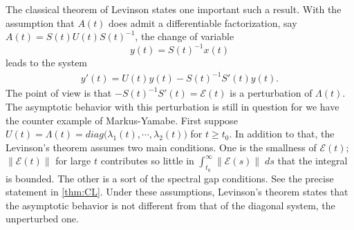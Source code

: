\documentclass[a4paper,11pt]{article}
\newcommand{\E}{\mathcal{E}}
\theoremstyle{remark}
\begin{document}
The classical theorem of Levinson states one important such a result. With the assumption that $A(t)$ does admit a differentiable factorization, say $A(t) = S(t)U(t)S(t)^{-1}$, the change of variable $$ y(t) = S(t)^{-1}x(t)$$
leads to the system
\begin{equation} \label{eq:1}
 \begin{aligned}
  y'(t) = U(t)y(t) - S(t)^{-1}S'(t)y(t).
 \end{aligned}
\end{equation}
The point of view is that $- S(t)^{-1}S'(t) = \E(t)$ is a perturbation of $\Lambda(t)$. The asymptotic behavior with this perturbation is still in question for we have the counter example of Markus-Yamabe. %
First suppose $U(t)=\Lambda(t)=diag(\lambda_1(t), \cdots, \lambda_2(t)\big)$ for $t \ge t_0$. In addition to that, the Levinson's theorem assumes two main conditions. One is the smallness of $\E(t)$; $\|\E(t)\|$ for large $t$ contributes so little in $\int_{t_0}^\infty \|\E(s)\| \;ds$ that the integral is bounded. The other is a sort of the spectral gap conditions. See the precise statement in \ref{thm:CL}. Under these assumptions, Levinson's theorem states that the asymptotic behavior is not different from that of the diagonal system, the unperturbed one. 
% 
% 
\end{document}
